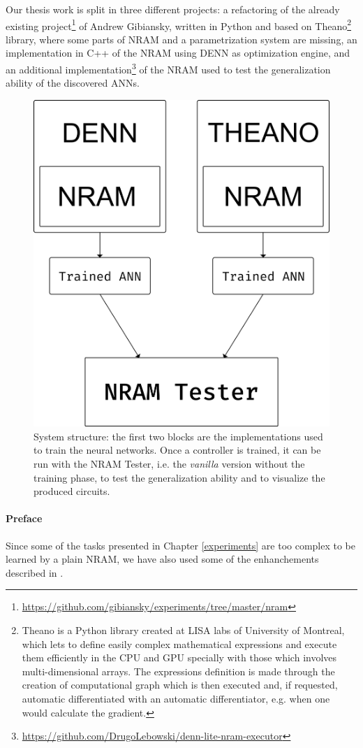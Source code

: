 
\label{chap:implementation}
Our thesis work is split in three different projects: a refactoring of the already existing project\footnote{\hyperref[https://github.com/gibiansky/experiments/tree/master/nram]{https://github.com/gibiansky/experiments/tree/master/nram}} of Andrew Gibiansky, written in Python and based on Theano\footnote{Theano is a Python library created at LISA labs of University of Montreal, which lets to define easily complex mathematical expressions and execute them efficiently in the CPU and GPU specially with those which involves multi-dimensional arrays. The expressions definition is made through the creation of computational graph which is then executed and, if requested, automatic differentiated with an automatic differentiator, e.g. when one would calculate the gradient.} library, where some parts of NRAM and a parametrization system are missing, an implementation in C++ of the NRAM using DENN as optimization engine, and an additional implementation\footnote{\hyperref[https://github.com/DrugoLebowski/denn-lite-nram-executor]{https://github.com/DrugoLebowski/denn-lite-nram-executor}} of the NRAM used to test the generalization ability of the discovered ANNs.
\begin{figure}[h]
	\centering
	\includegraphics[width=0.5\linewidth]{figures/NRAM-implementation.png}
	\caption{System structure: the first two blocks are the implementations used to train the neural networks. Once a controller is trained, it can be run with the NRAM Tester, i.e. the \textit{vanilla} version without the training phase, to test the generalization ability and to visualize the produced circuits.}
	\label{fig:nram-implementation-scheme}
\end{figure}

\paragraph{Preface}
Since some of the tasks presented in Chapter \ref{experiments} are too complex to be learned by a plain NRAM, we have also used some of the enhanchements described in \cite{NRAM:2016}.

